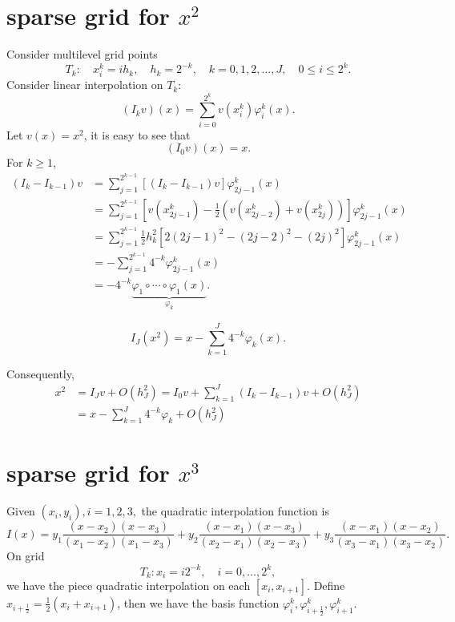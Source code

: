\section{sparse grid for $x^2$}
Consider multilevel grid points
$$
T_k:\quad x_i^k = ih_k,\quad h_k = 2^{-k},\quad k=0,1,2,...,J,\quad 0\le i\le 2^k.
$$
Consider linear interpolation on $T_k$:
$$
(I_k v)(x) = \sum_{i=0}^{2^k}v(x_i^k)\varphi_i^k(x).
$$
Let $v(x)=x^2$, it is easy to see that
$$
(I_0v)(x) = x.
$$
For $k\ge 1$,
\[
\begin{split}
(I_k-I_{k-1})v &= \sum_{j=1}^{2^{k-1}}[(I_k-I_{k-1})v]\varphi_{2j-1}^k(x)\\
&=\sum_{j=1}^{2^{k-1}}[v(x_{2j-1}^k)-\frac{1}{2}(v(x_{2j-2}^k)+v(x_{2j}^k))]\varphi_{2j-1}^k(x)\\
&=\sum_{j=1}^{2^{k-1}}\frac{1}{2}h_k^2[2(2j-1)^2-(2j-2)^2-(2j)^2]\varphi_{2j-1}^k(x)\\
&=-\sum_{j=1}^{2^{k-1}}4^{-k}\varphi_{2j-1}^k(x)\\
&=-4^{-k}\underbrace{\varphi_1\circ\cdots\circ\varphi_1(x)}\limits_{\varphi_k}.
\end{split}
\]

\begin{lemma}
	$$
	I_J(x^2) = x-\sum_{k=1}^J4^{-k}\varphi_k(x).
	$$
\end{lemma}
Consequently,
\[
\begin{split}
x^2 &= I_Jv + O(h_J^2) = I_0v+\sum_{k=1}^J(I_k-I_{k-1})v+O(h_J^2)\\
&=x - \sum_{k=1}^J4^{-k}\varphi_k + O(h_J^2)
\end{split}
\]



\section{sparse grid for $x^3$}

Given $(x_i,y_i),i=1,2,3,$ the quadratic interpolation function is 
\[
I(x) = y_1\frac{(x-x_2)(x-x_3)}{(x_1-x_2)(x_1-x_3)}+y_2\frac{(x-x_1)(x-x_3)}{(x_2-x_1)(x_2-x_3)}+y_3\frac{(x-x_1)(x-x_2)}{(x_3-x_1)(x_3-x_2)}.
\]
On grid 
\[T_k: x_i = i2^{-k},\quad i = 0,...,2^k,
\]
we have the piece quadratic interpolation on each $[x_i,x_{i+1}]$. Define $x_{i+\frac{1}{2}} = \frac{1}{2}(x_i+x_{i+1})$, then we have the basis function $\varphi_i^k,\varphi_{i+\frac{1}{2}}^k,\varphi_{i+1}^k$.

